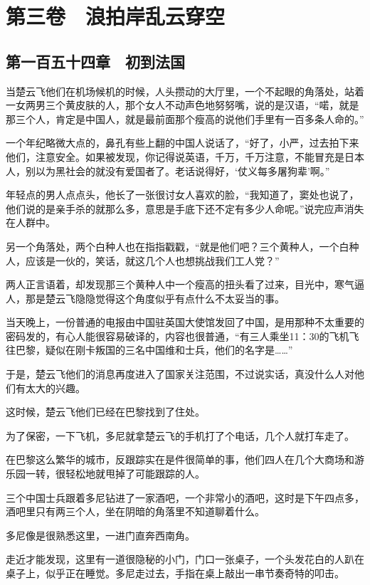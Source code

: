 \chapter{第三卷　浪拍岸乱云穿空}

\section{第一百五十四章　初到法国}

当楚云飞他们在机场候机的时候，人头攒动的大厅里，一个不起眼的角落处，站着一女两男三个黄皮肤的人，那个女人不动声色地努努嘴，说的是汉语，“喏，就是那三个人，肯定是中国人，就是最前面那个瘦高的说他们手里有一百多条人命的。”

一个年纪略微大点的，鼻孔有些上翻的中国人说话了，“好了，小严，过去拍下来他们，注意安全。如果被发现，你记得说英语，千万，千万注意，不能冒充是日本人，别以为黑社会的就没有爱国者了。老话说得好，‘仗义每多屠狗辈’啊。”

年轻点的男人点点头，他长了一张很讨女人喜欢的脸，“我知道了，窦处也说了，他们说的是亲手杀的就那么多，意思是手底下还不定有多少人命呢。”说完应声消失在人群中。

另一个角落处，两个白种人也在指指戳戳，“就是他们吧？三个黄种人，一个白种人，应该是一伙的，笑话，就这几个人也想挑战我们工人党？”

两人正言语着，却发现那三个黄种人中一个瘦高的扭头看了过来，目光中，寒气逼人，那是楚云飞隐隐觉得这个角度似乎有点什么不太妥当的事。

当天晚上，一份普通的电报由中国驻英国大使馆发回了中国，是用那种不太重要的密码发的，有心人能很容易破译的，内容也很普通，“有三人乘坐11：30的飞机飞往巴黎，疑似在刚卡叛国的三名中国维和士兵，他们的名字是……”

于是，楚云飞他们的消息再度进入了国家关注范围，不过说实话，真没什么人对他们有太大的兴趣。

这时候，楚云飞他们已经在巴黎找到了住处。

为了保密，一下飞机，多尼就拿楚云飞的手机打了个电话，几个人就打车走了。

在巴黎这么繁华的城市，反跟踪实在是件很简单的事，他们四人在几个大商场和游乐园一转，很轻松地就甩掉了可能跟踪的人。

三个中国士兵跟着多尼钻进了一家酒吧，一个非常小的酒吧，这时是下午四点多，酒吧里只有两三个人，坐在阴暗的角落里不知道聊着什么。

多尼像是很熟悉这里，一进门直奔西南角。

走近才能发现，这里有一道很隐秘的小门，门口一张桌子，一个头发花白的人趴在桌子上，似乎正在睡觉。多尼走过去，手指在桌上敲出一串节奏奇特的叩击。

